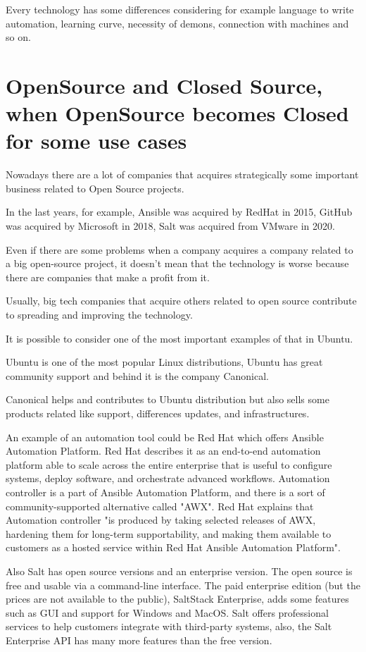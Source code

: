 \documentclass[12pt,a4paper,openright,twoside]{book}
\begin{document}
Every technology has some differences considering for example language to write automation, learning curve, necessity of demons, connection with machines and so on.

\section{OpenSource and Closed Source, when OpenSource becomes Closed for some use cases}
Nowadays there are a lot of companies that acquires strategically some important business related to Open Source projects.


In the last years, for example, Ansible was acquired by RedHat in 2015, GitHub was acquired by Microsoft in 2018, Salt was acquired from VMware in 2020.


Even if there are some problems when a company acquires a company related to a big open-source project, it doesn't mean that the technology is worse because there are companies that make a profit from it.

Usually, big tech companies that acquire others related to open source contribute to spreading and improving the technology.


It is possible to consider one of the most important examples of that in Ubuntu.


Ubuntu is one of the most popular Linux distributions, Ubuntu has great community support and behind it is the company Canonical.


Canonical helps and contributes to Ubuntu distribution but also sells some products related like support, differences updates, and infrastructures.

An example of an automation tool could be Red Hat which offers Ansible Automation Platform.
Red Hat describes it as an end-to-end automation platform able to scale across the entire enterprise that is useful to configure systems, deploy software, and orchestrate advanced workflows.\cite{ansibleAutomationPlatform}
Automation controller is a part of Ansible Automation Platform, and there is a sort of community-supported alternative called "AWX"\cite{ansibleAwxAAP}.
Red Hat explains that Automation controller "is produced by taking selected releases of AWX, hardening them for long-term supportability, and making them available to customers as a hosted service within Red Hat Ansible Automation Platform"\cite{ansibleFaq}.

Also Salt has open source versions and an enterprise version. The open source is free and usable via a command-line interface.
The paid enterprise edition (but the prices are not available to the public), SaltStack Enterprise, adds some features such as GUI and support for Windows and MacOS.
Salt offers professional services to help customers integrate with third-party systems, also, the Salt Enterprise API has many more features than the free version.\cite{saltTechTarget}
\end{document}
